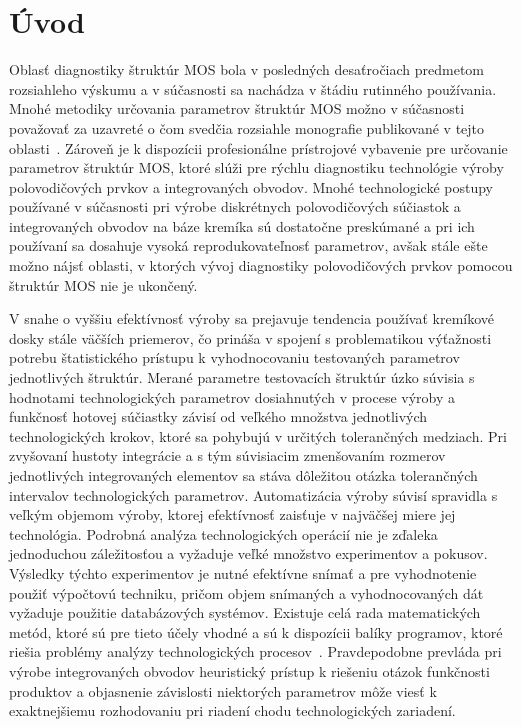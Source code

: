 \chapter{Úvod}\label{Introduction}

\par Oblasť diagnostiky štruktúr MOS bola v posledných desaťročiach
predmetom rozsiahleho výskumu a v súčasnosti sa nachádza v štádiu
rutinného používania. Mnohé metodiky určovania parametrov štruktúr MOS
možno v súčasnosti považovať za uzavreté o čom svedčia rozsiahle
monografie publikované v tejto oblasti~\cite{I.1, I.2, I.3,
  I.4}. Zároveň je k dispozícii profesionálne prístrojové vybavenie
pre určovanie parametrov štruktúr MOS, ktoré slúži pre rýchlu
diagnostiku technológie výroby polovodičových prvkov a integrovaných
obvodov. Mnohé technologické postupy používané v súčasnosti pri výrobe
diskrétnych polovodičových súčiastok a integrovaných obvodov na báze
kremíka sú dostatočne preskúmané a pri ich používaní sa dosahuje
vysoká reprodukovateľnosť parametrov, avšak stále ešte možno nájsť
oblasti, v ktorých vývoj diagnostiky polovodičových prvkov pomocou
štruktúr MOS nie je ukončený.

\par V snahe o vyššiu efektívnosť výroby sa prejavuje tendencia
používať kremíkové dosky stále väčších priemerov, čo prináša v spojení
s problematikou výťažnosti potrebu štatistického prístupu k
vyhodnocovaniu testovaných parametrov jednotlivých štruktúr. Merané
parametre testovacích štruktúr úzko súvisia s hodnotami
technologických parametrov dosiahnutých v procese výroby a funkčnosť
hotovej súčiastky závisí od veľkého množstva jednotlivých
technologických krokov, ktoré sa pohybujú v určitých tolerančných
medziach. Pri zvyšovaní hustoty integrácie a s tým súvisiacim
zmenšovaním rozmerov jednotlivých integrovaných elementov sa stáva
dôležitou otázka tolerančných intervalov technologických
parametrov. Automatizácia výroby súvisí spravidla s veľkým objemom
výroby, ktorej efektívnosť zaisťuje v najväčšej miere jej
technológia. Podrobná analýza technologických operácií nie je zďaleka
jednoduchou záležitosťou a vyžaduje veľké množstvo experimentov a
pokusov. Výsledky týchto experimentov je nutné efektívne snímať a pre
vyhodnotenie použiť výpočtovú techniku, pričom objem snímaných a
vyhodnocovaných dát vyžaduje použitie databázových systémov.  Existuje
celá rada matematických metód, ktoré sú pre tieto účely vhodné a sú k
dispozícii balíky programov, ktoré riešia problémy analýzy
technologických procesov~\cite{I.5}. Pravdepodobne prevláda pri výrobe
integrovaných obvodov heuristický prístup k riešeniu otázok funkčnosti
produktov a objasnenie závislosti niektorých parametrov môže viesť k
exaktnejšiemu rozhodovaniu pri riadení chodu technologických
zariadení.

